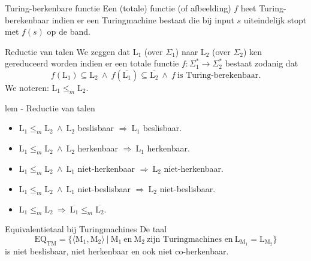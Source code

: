 \vspace{0.5cm}

\begin{theo}{Turing-berkenbare functie}
    Een (totale) functie (of afbeelding) $f$ heet Turing-berekenbaar indien er een Turingmachine bestaat die bij input $s$ uiteindelijk stopt met $f(s)$ op de band.
\end{theo}

\begin{theo}{Reductie van talen}
    We zeggen dat L$_1$ (over $\Sigma_1$) naar L$_2$ (over $\Sigma_2$) ken gereduceerd worden indien er een totale functie $f: \Sigma_1^* \to \Sigma_2^*$ bestaat zodanig dat
    \begin{equation*}
        f(\text{L}_1) \subseteq \text{L}_2 \ \land \ f(\overline{\text{L}_1}) \subseteq \overline{\text{L}_2} \ \land \ f \ \text{is Turing-berekenbaar}.
    \end{equation*}
    We noteren: $\text{L}_1 \leq_m \text{L}_2$.
\end{theo}

\begin{lem}{lem - Reductie van talen}
    \begin{itemize}
        \item 
            $\text{L}_1 \leq_m \text{L}_2 \ \land \ \text{L}_2$ beslisbaar $\Rightarrow \ \text{L}_1$ beslisbaar.
        \item 
            $\text{L}_1 \leq_m \text{L}_2 \ \land \ \text{L}_2$ herkenbaar $\Rightarrow \ \text{L}_1$ herkenbaar.
        \item 
            $\text{L}_1 \leq_m \text{L}_2 \ \land \ \text{L}_1$ niet-herkenbaar $\Rightarrow \ \text{L}_2$ niet-herkenbaar.
        \item 
            $\text{L}_1 \leq_m \text{L}_2 \ \land \ \text{L}_1$ niet-beslisbaar $\Rightarrow \ \text{L}_2$ niet-beslisbaar.
        \item 
            $\text{L}_1 \leq_m \text{L}_2 \ \Rightarrow \ \overline{\text{L}_1} \leq_m \overline{\text{L}_2}$.
    \end{itemize}
\end{lem}

\begin{lem}{Equivalentietaal bij Turingmachines}
    De taal
    \begin{equation*}
        \text{EQ}_{\text{TM}} = \{\langle \text{M}_1, \text{M}_2 \rangle \ | \ \text{M}_1 \ \text{en} \ \text{M}_2 \ \text{zijn Turingmachines en} \ \text{L}_{\text{M}_1} = \text{L}_{\text{M}_2} \}
    \end{equation*}
    is niet beslisbaar, niet herkenbaar en ook niet co-herkenbaar.
\end{lem}

